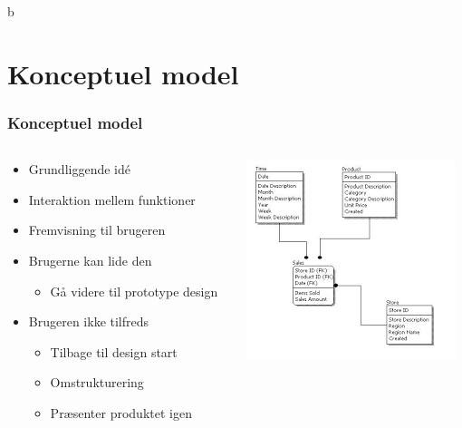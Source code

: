 b\documentclass{beamer}
\begin{document}
\section{Konceptuel model}
\begin{frame}
\frametitle{Konceptuel model}
  \begin{columns}[T]
    \begin{column}{.5\textwidth}
	  \begin{itemize}
		\item Grundliggende idé
		\item Interaktion mellem funktioner
	    \item Fremvisning til brugeren
	    \item Brugerne kan lide den
	    \begin{itemize}
	      \item Gå videre til prototype design
	    \end{itemize}
	    \item Brugeren ikke tilfreds
	    \begin{itemize}
	      \item Tilbage til design start
	      \item Omstrukturering
	      \item Præsenter produktet igen
	    \end{itemize}
	  \end{itemize}
    \end{column}
    \begin{column}{.5\textwidth}
      \includegraphics[width=\textwidth]{conceptual.png}
    \end{column}
  \end{columns}
\end{frame}
\end{document}
